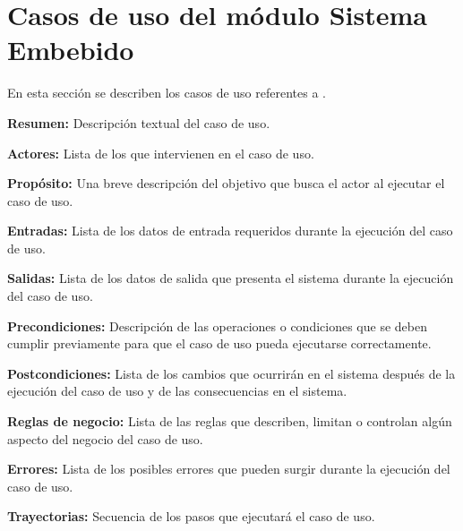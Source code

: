 
\section{Casos de uso del módulo Sistema Embebido}
En esta sección se describen los casos de uso referentes a . \bigskip

     \begin{objetivos}
	\item {\bf Resumen:} Descripción textual del caso de uso.
	\item {\bf Actores:} Lista de los que intervienen en el caso de uso.
	\item {\bf Propósito:} Una breve descripción del objetivo que busca el actor al ejecutar el caso de uso.
	\item {\bf Entradas:} Lista de los datos de entrada requeridos durante la ejecución del caso de uso.
	\item {\bf Salidas:} Lista de los datos de salida que presenta el sistema durante la ejecución del caso de uso.
	\item {\bf Precondiciones:} Descripción de las operaciones o condiciones que se deben cumplir previamente para que el caso de uso pueda ejecutarse correctamente.
	\item {\bf Postcondiciones:} Lista de los cambios que ocurrirán en el sistema después de la ejecución del caso de uso y de las consecuencias en el sistema.
	\item {\bf Reglas de negocio:} Lista de las reglas que describen, limitan o controlan algún aspecto del negocio del caso de uso.
	\item {\bf Errores:} Lista de los posibles errores que pueden surgir durante la ejecución del caso de uso.
	\item {\bf Trayectorias:} Secuencia de los pasos que ejecutará el caso de uso.
    \end{objetivos}


